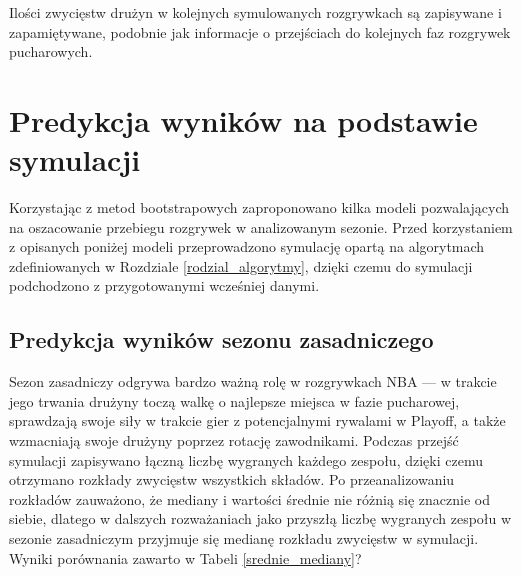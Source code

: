 \documentclass[inzynierska]{pwr_wmat_praca_dyplomowa}
\theoremstyle{plain}
\numberwithin{theorem}{chapter}
\theoremstyle{definition}
\numberwithin{theorem}{chapter}
\begin{document}
Ilości zwycięstw drużyn w kolejnych symulowanych rozgrywkach są zapisywane i zapamiętywane, podobnie jak informacje o przejściach do kolejnych faz rozgrywek pucharowych. 

\section{Predykcja wyników na podstawie symulacji}
Korzystając z metod bootstrapowych zaproponowano kilka modeli pozwalających na oszacowanie przebiegu rozgrywek w analizowanym sezonie.
Przed korzystaniem z opisanych poniżej modeli przeprowadzono symulację opartą na algorytmach zdefiniowanych w Rozdziale \ref{rodzial_algorytmy}, dzięki czemu do symulacji podchodzono z przygotowanymi wcześniej danymi.

\subsection{Predykcja wyników sezonu zasadniczego} \label{predykcja_zasadniczego}
Sezon zasadniczy odgrywa bardzo ważną rolę w rozgrywkach NBA --- w trakcie jego trwania drużyny toczą walkę o najlepsze miejsca w fazie pucharowej, sprawdzają swoje siły w trakcie gier z potencjalnymi rywalami w Playoff, a także wzmacniają swoje drużyny poprzez rotację zawodnikami. Podczas przejść symulacji zapisywano łączną liczbę wygranych każdego zespołu, dzięki czemu otrzymano rozkłady zwycięstw wszystkich składów. Po przeanalizowaniu rozkładów zauważono, że mediany i wartości średnie nie różnią się znacznie od siebie, dlatego w dalszych rozważaniach jako przyszłą liczbę wygranych zespołu w sezonie zasadniczym przyjmuje się medianę rozkładu zwycięstw w symulacji. Wyniki porównania zawarto w Tabeli \ref{srednie_mediany}?
\end{document}
